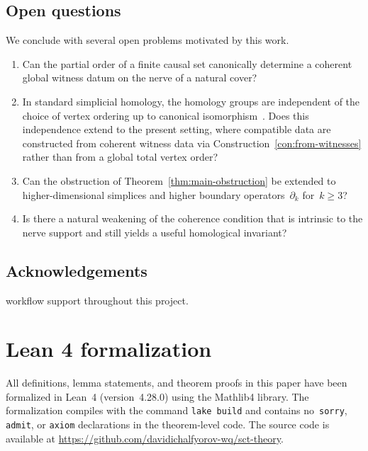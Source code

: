 \documentclass[11pt,a4paper]{article}
\theoremstyle{plain}
\theoremstyle{definition}
\theoremstyle{remark}
\begin{document}
\subsection{Open questions}

We conclude with several open problems motivated by this work.

\begin{enumerate}[nosep]
  \item Can the partial order of a finite causal set canonically
        determine a coherent global witness datum on the nerve of
        a natural cover?
  \item In standard simplicial homology, the homology groups are
        independent of the choice of vertex ordering up to canonical
        isomorphism~\cite[Section~2.1]{Hatcher:2002}. Does this
        independence extend to the present setting, where compatible
        data are constructed from coherent witness data via
        Construction~\ref{con:from-witnesses} rather than from a
        global total vertex order?
  \item Can the obstruction of Theorem~\ref{thm:main-obstruction}
        be extended to higher-dimensional simplices and higher
        boundary operators~$\partial_k$ for~$k \geq 3$?
  \item Is there a natural weakening of the coherence condition that
        is intrinsic to the nerve support and still yields a useful
        homological invariant?
\end{enumerate}

\subsection*{Acknowledgements}

workflow support throughout this project.

\appendix

\section{Lean 4 formalization}
\label{app:lean}

All definitions, lemma statements, and theorem proofs in this paper
have been formalized in Lean~4 (version~4.28.0) using the Mathlib4
library. The formalization compiles with the command \texttt{lake build}
and contains no~\texttt{sorry}, \texttt{admit}, or \texttt{axiom}
declarations in the theorem-level code. The source code is available at
\url{https://github.com/davidichalfyorov-wq/sct-theory}.
\end{document}
